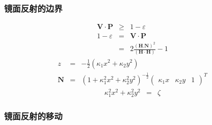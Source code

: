 \documentclass{beamer}
\newcommand{\cdummy}{\cdot}
\newcommand{\point}{.}
\newcommand{\tmmathbf}[1]{\ensuremath{\boldsymbol{#1}}}
\begin{document}
{{\begin{frame}
  \frametitle{镜面反射的边界}
  
  
  \begin{eqnarray*}
    \tmmathbf{V} \cdummy \tmmathbf{P} & \geqslant & 1 - \varepsilon\\
    1 - \varepsilon & = & \tmmathbf{V} \cdummy \tmmathbf{P}\\
    & = & 2 \frac{(\tmmathbf{H} \point \tmmathbf{N})^2}{(\tmmathbf{H} \cdummy
    \tmmathbf{H})} - 1
  \end{eqnarray*}
  \begin{eqnarray*}
    z & = & - \frac{1}{2} (\kappa_1 x^2 + \kappa_2 y^2)\\
    \tmmathbf{N} & = & (1 + \kappa^2_1 x^2 + \kappa^2_2 y^2)^{- \frac{1}{2}}
    \left(\begin{array}{ccc}
      \kappa_1 x & \kappa_2 y & 1
    \end{array}\right)^T
  \end{eqnarray*}
  \begin{eqnarray*}
    \kappa^2_1 x^2 + \kappa_2^2 y^2 & = & \zeta
  \end{eqnarray*}
\end{frame}

\begin{frame}
  \frametitle{镜面反射的移动}
  
\end{frame}

\begin{frame}
  \frametitle{}
  

\end{frame}}}
\end{document}
